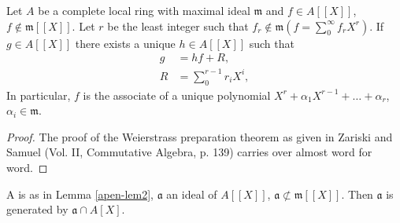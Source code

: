 \begin{lem}\label{apen-lem2}
Let $A$ be a complete local ring with maximal ideal $\mathfrak{m}$ and $f \in A [[X]]$, $f\notin\mathfrak{m}[[X]]$. Let $r$ be the least integer such that $f_r \not\in \mathfrak{m} \left(f = \sum\limits^\infty_0 f_r X^r \right)$. If $g \in A [[X]]$ there exists a unique $h \in A [[X]]$ such that 
\begin{align*}
g & = hf + R,\\
R & = \sum\limits^{r-1}_{0} r_i X^i,
\end{align*}
In particular, $f$ is the associate of a unique polynomial $X^r+\alpha_1 X^{r-1} + \ldots +\alpha_r$, $\alpha_i \in \mathfrak{m}$.
\end{lem}

\begin{proof}
The proof of the Weierstrass preparation theorem as given in Zariski and Samuel (Vol. II, Commutative Algebra, p. 139) carries over almost word for word.
\end{proof}

\begin{lem}\label{apen-lem3}
A is as in Lemma \ref{apen-lem2}, $\mathfrak{a}$ an ideal of $A \left[[X] \right]$, $\mathfrak{a} \not\subset \mathfrak{m} [[X]]$. Then $\mathfrak{a}$ is generated by $\mathfrak{a} \cap A [X]$. 
\end{lem}

